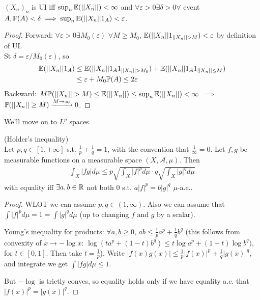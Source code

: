 \documentclass[a4paper]{article}
\begin{document}
\begin{rem}
$(X_n)_n$ is UI iff $\sup_n \E(||X_n||)<\infty$ and $\forall \varepsilon>0 \exists \delta>0 \forall $ event $A, \P(A) < \delta \implies \sup_n \E(||X_n||1_A)<\varepsilon$.
\begin{proof}
Forward: $\forall \varepsilon>0 \exists M_0(\varepsilon)$ $\forall M \geq M_0$, $\E(||X_n||1_{||X_n||>M})<\varepsilon$ by definition of UI.\\
St $\delta = \varepsilon/M_0(\varepsilon)$, so
\begin{equation*}
\begin{aligned}
\E(||X_n||1_A) &\leq \E(||X_n||1_A 1_{||X_n||>M_0}) + \E(||X_n||1_A 1_{||X_n||\leq M})\\
&\leq \varepsilon+M_0 \P(A) \leq 2\varepsilon
\end{aligned}
\end{equation*}
Backward: $M\P(||X_n||>M) \leq \E(||X_n||) \leq \sup_n \E(||X_n||)<\infty$ $\implies$ $\P(||X_n||\geq M) \xrightarrow{M \to \infty} 0$.
\end{proof}
\end{rem}

We'll move on to $L^p$ spaces.

\begin{prop} (Holder's inequality)\\
Let $p,q \in [1,+\infty]$ s.t. $\frac{1}{p} + \frac{1}{q} = 1$, with the convention that $\frac{1}{\infty} = 0$. Let $f,g$ be measurable functions on a measurable space $(X,\mathcal{A},\mu)$. Then
\begin{equation*}
\begin{aligned}
\int_X |fg| d\mu \leq p\sqrt{\int_X |f|^p d\mu} \cdot q\sqrt{\int_X |g|^q d\mu}
\end{aligned}
\end{equation*}
with equality iff $\exists a,b \in \R$ not both $0$ s.t. $a|f|^p = b|g|^q$ $\mu$-a.e..
\begin{proof}
WLOT we can assume $p,q \in (1,\infty)$. Also we can assume that $\int |f|^p d\mu = 1 = \int |g|^q d\mu$ (up to changing $f$ and $g$ by a scalar).

Young's inequality for products: $\forall a,b \geq 0$, $ab \leq \frac{1}{p} a^p + \frac{1}{q} b^q$ (this follows from convexity of $x \to -\log x$: $\log (ta^p + (1-t)b^q) \leq t\log a^p + (1-t) \log b^q)$, for $t \in [0,1]$. Then take $t=\frac{1}{p}$). Write $|f(x) g(x)| \leq \frac{1}{p} |f(x)|^p + \frac{1}{q} |g(x)|^q$, and integrate we get $\int|fg|d\mu \leq 1$.

But $-\log$ is trictly conves, so equality holds only if we have equality a.e. that $|f(x)|^p = |g(x)|^q$.
\end{proof}
\end{prop}
\end{document}
